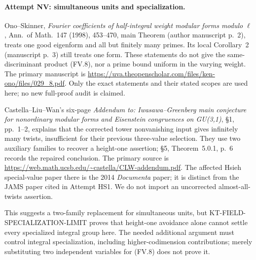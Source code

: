 \paragraph{Attempt NV: simultaneous units and specialization.}
Ono--Skinner, \emph{Fourier coefficients of half-integral weight
modular forms modulo $\ell$}, Ann.\ of Math.\ 147 (1998),
453--470, main Theorem (author manuscript p.~2), treats one
good eigenform and all but finitely many primes. Its local
Corollary~2 (manuscript p.~3) still treats one form. These
statements do not give the same-discriminant product (FV.8),
nor a prime bound uniform in the varying weight. The primary
manuscript is
\url{https://uva.theopenscholar.com/files/ken-ono/files/029_8.pdf}.
Only the exact statements and their stated scopes are used here;
no new full-proof audit is claimed.

Castella--Liu--Wan's six-page \emph{Addendum to: Iwasawa--Greenberg
main conjecture for nonordinary modular forms and Eisenstein
congruences on GU(3,1)}, \S1, pp.~1--2, explains that the corrected
tower nonvanishing input gives infinitely many twists, insufficient
for their previous three-value selection. They use two auxiliary
families to recover a height-one assertion; \S5, Theorem~5.0.1,
p.~6 records the repaired conclusion. The primary source is
\url{https://web.math.ucsb.edu/~castella/CLW-addendum.pdf}.
The affected Hsieh special-value paper there is the 2014
\emph{Documenta} paper; it is distinct from the JAMS paper
cited in Attempt HS1. We do not import an uncorrected
almost-all-twists assertion.

This suggests a two-family replacement for simultaneous units,
but KT-FIELD-SPECIALIZATION-LIMIT proves that height-one avoidance
alone cannot settle every specialized integral group here.
The needed additional argument must control integral specialization,
including higher-codimension contributions; merely substituting
two independent variables for (FV.8) does not prove it.
